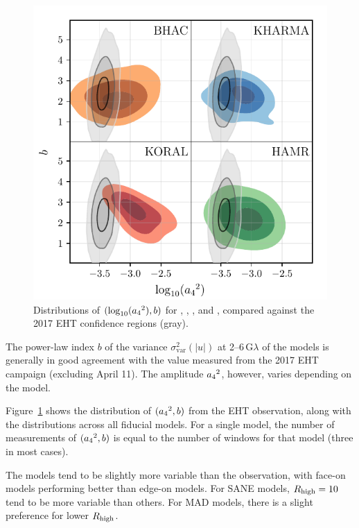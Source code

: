 \begin{figure}
  \centering
  \includegraphics[width=\columnwidth]{./figures/grmhd_triangle_debiased_combined.pdf}
  \caption{Distributions of $(\log_{10}({a_4}^2), b)$ for \bhac, \kharma, \koral, and \hamr, compared against the 2017 EHT confidence regions (gray).}
  \label{fig:cmp_VLBI_var}
\end{figure}

The power-law index $b$ of the variance $\sigma_\text{var}^2 (|u|)$ at 2--6\,G$\lambda$ of the models is generally in good agreement with the value measured  from the 2017 EHT campaign (excluding April 11).
The amplitude ${a_4}^2$, however, varies depending on the model.

Figure~\ref{fig:cmp_VLBI_var} shows the distribution of $({a_4}^2, b)$ from the EHT observation, along with the distributions across all fiducial models.
For a single model, the number of measurements of $({a_4}^2, b)$ is equal to the number of windows for that model (three in most cases).

The models tend to be slightly more variable than the observation, with face-on models performing better than edge-on models.
For SANE models, $R_\mathrm{high} = 10$ tend to be more variable than others.
For MAD models, there is a slight preference for lower $R_\mathrm{high}$.

